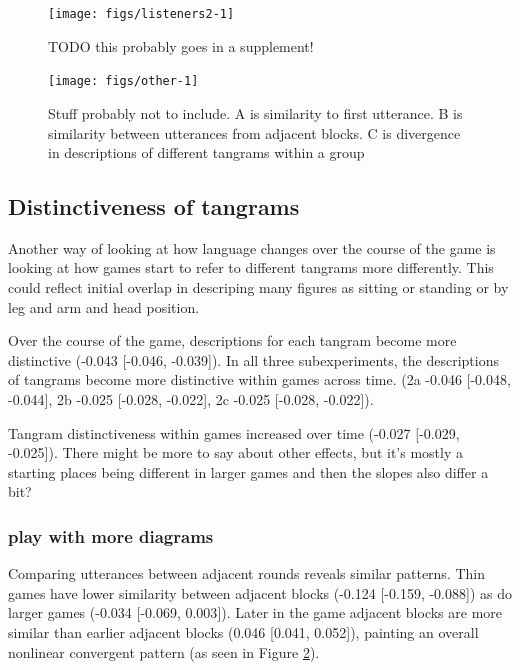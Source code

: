 \documentclass[
  english,
  a4paper,
]{article}
\begin{document}
\begin{figure}[t!]

{\centering \texttt{[image: figs/listeners2-1]} 

}

\caption{TODO this probably goes in a supplement! }\label{fig:listeners2}
\end{figure}

\begin{figure}[t!]

{\centering \texttt{[image: figs/other-1]} 

}

\caption{Stuff probably not to include. A is similarity to first utterance. B is similarity between utterances from adjacent blocks. C is divergence in descriptions of different tangrams within a group}\label{fig:other}
\end{figure}

\hypertarget{distinctiveness-of-tangrams}{%
\subsection{Distinctiveness of tangrams}\label{distinctiveness-of-tangrams}}

Another way of looking at how language changes over the course of the game is looking at how games start to refer to different tangrams more differently. This could reflect initial overlap in descriping many figures as sitting or standing or by leg and arm and head position.

Over the course of the game, descriptions for each tangram become more distinctive (-0.043 {[}-0.046, -0.039{]}).
In all three subexperiments, the descriptions of tangrams become more distinctive within games across time. (2a -0.046 {[}-0.048, -0.044{]}, 2b -0.025 {[}-0.028, -0.022{]}, 2c -0.025 {[}-0.028, -0.022{]}).

Tangram distinctiveness within games increased over time (-0.027 {[}-0.029, -0.025{]}). There might be more to say about other effects, but it's mostly a starting places being different in larger games and then the slopes also differ a bit?

\hypertarget{play-with-more-diagrams}{%
\subsubsection{play with more diagrams}\label{play-with-more-diagrams}}

Comparing utterances between adjacent rounds reveals similar patterns. Thin games have lower similarity between adjacent blocks (-0.124 {[}-0.159, -0.088{]}) as do larger games (-0.034 {[}-0.069, 0.003{]}). Later in the game adjacent blocks are more similar than earlier adjacent blocks (0.046 {[}0.041, 0.052{]}), painting an overall nonlinear convergent pattern (as seen in Figure \ref{fig:other}).
\end{document}
